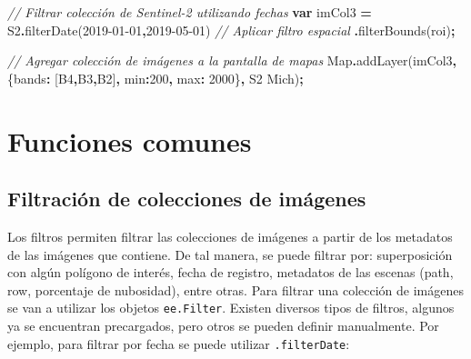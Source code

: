 \documentclass[
  12pt,
  letterpaper,
  twoside]{book}
\newenvironment{Shaded}{\begin{snugshade}}{\end{snugshade}}
\newcommand{\BuiltInTok}[1]{#1}
\newcommand{\CommentTok}[1]{\textcolor[rgb]{0.56,0.35,0.01}{\textit{#1}}}
\newcommand{\DataTypeTok}[1]{\textcolor[rgb]{0.13,0.29,0.53}{#1}}
\newcommand{\DecValTok}[1]{\textcolor[rgb]{0.00,0.00,0.81}{#1}}
\newcommand{\FunctionTok}[1]{\textcolor[rgb]{0.00,0.00,0.00}{#1}}
\newcommand{\KeywordTok}[1]{\textcolor[rgb]{0.13,0.29,0.53}{\textbf{#1}}}
\newcommand{\NormalTok}[1]{#1}
\newcommand{\OperatorTok}[1]{\textcolor[rgb]{0.81,0.36,0.00}{\textbf{#1}}}
\newcommand{\StringTok}[1]{\textcolor[rgb]{0.31,0.60,0.02}{#1}}
\begin{document}
\begin{Shaded}
\begin{Highlighting}[]
\CommentTok{// Filtrar colección de Sentinel{-}2 utilizando fechas}
\KeywordTok{var}\NormalTok{ imCol3 }\OperatorTok{=}\NormalTok{ S2}\OperatorTok{.}\FunctionTok{filterDate}\NormalTok{(}\StringTok{\textquotesingle{}2019{-}01{-}01\textquotesingle{}}\OperatorTok{,}\StringTok{\textquotesingle{}2019{-}05{-}01\textquotesingle{}}\NormalTok{)}
  \CommentTok{// Aplicar filtro espacial}
 \OperatorTok{.}\FunctionTok{filterBounds}\NormalTok{(roi)}\OperatorTok{;}

\CommentTok{// Agregar colección de imágenes a la pantalla de mapas}
\BuiltInTok{Map}\OperatorTok{.}\FunctionTok{addLayer}\NormalTok{(imCol3}\OperatorTok{,}\NormalTok{ \{}\DataTypeTok{bands}\OperatorTok{:}\NormalTok{ [}\StringTok{\textquotesingle{}B4\textquotesingle{}}\OperatorTok{,}\StringTok{\textquotesingle{}B3\textquotesingle{}}\OperatorTok{,}\StringTok{\textquotesingle{}B2\textquotesingle{}}\NormalTok{]}\OperatorTok{,} \DataTypeTok{min}\OperatorTok{:}\DecValTok{200}\OperatorTok{,} \DataTypeTok{max}\OperatorTok{:} \DecValTok{2000}\NormalTok{\}}\OperatorTok{,} 
  \StringTok{\textquotesingle{}S2 Mich\textquotesingle{}}\NormalTok{)}\OperatorTok{;}
\end{Highlighting}
\end{Shaded}

\hypertarget{funciones-comunes-4}{%
\section{Funciones comunes}\label{funciones-comunes-4}}

\hypertarget{filtraciuxf3n-de-colecciones-de-imuxe1genes}{%
\subsection{Filtración de colecciones de imágenes}\label{filtraciuxf3n-de-colecciones-de-imuxe1genes}}

Los filtros permiten filtrar las colecciones de imágenes a partir de los metadatos de las imágenes que contiene. De tal manera, se puede filtrar por: superposición con algún polígono de interés, fecha de registro, metadatos de las escenas (path, row, porcentaje de nubosidad), entre otras. Para filtrar una colección de imágenes se van a utilizar los objetos \texttt{ee.Filter}. Existen diversos tipos de filtros, algunos ya se encuentran precargados, pero otros se pueden definir manualmente. Por ejemplo, para filtrar por fecha se puede utilizar \texttt{.filterDate}:
\end{document}

